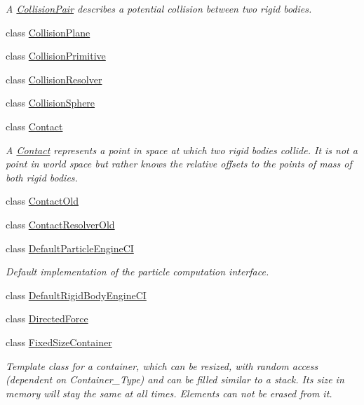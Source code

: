 \begin{DoxyCompactItemize}
\begin{DoxyCompactList}\small\item\em A \mbox{\hyperlink{classr3_1_1_collision_pair}{Collision\+Pair}} describes a potential collision between two rigid bodies. \end{DoxyCompactList}\item 
class \mbox{\hyperlink{classr3_1_1_collision_plane}{Collision\+Plane}}
\item 
class \mbox{\hyperlink{classr3_1_1_collision_primitive}{Collision\+Primitive}}
\item 
class \mbox{\hyperlink{classr3_1_1_collision_resolver}{Collision\+Resolver}}
\item 
class \mbox{\hyperlink{classr3_1_1_collision_sphere}{Collision\+Sphere}}
\item 
class \mbox{\hyperlink{classr3_1_1_contact}{Contact}}
\begin{DoxyCompactList}\small\item\em A \mbox{\hyperlink{classr3_1_1_contact}{Contact}} represents a point in space at which two rigid bodies collide. It is not a point in world space but rather knows the relative offsets to the points of mass of both rigid bodies. \end{DoxyCompactList}\item 
class \mbox{\hyperlink{classr3_1_1_contact_old}{Contact\+Old}}
\item 
class \mbox{\hyperlink{classr3_1_1_contact_resolver_old}{Contact\+Resolver\+Old}}
\item 
class \mbox{\hyperlink{classr3_1_1_default_particle_engine_c_i}{Default\+Particle\+Engine\+CI}}
\begin{DoxyCompactList}\small\item\em Default implementation of the particle computation interface. \end{DoxyCompactList}\item 
class \mbox{\hyperlink{classr3_1_1_default_rigid_body_engine_c_i}{Default\+Rigid\+Body\+Engine\+CI}}
\item 
class \mbox{\hyperlink{classr3_1_1_directed_force}{Directed\+Force}}
\item 
class \mbox{\hyperlink{classr3_1_1_fixed_size_container}{Fixed\+Size\+Container}}
\begin{DoxyCompactList}\small\item\em Template class for a container, which can be resized, with random access (dependent on Container\+\_\+\+Type) and can be filled similar to a stack. Its size in memory will stay the same at all times. Elements can not be erased from it. \end{DoxyCompactList}\item 

\end{DoxyCompactItemize}
